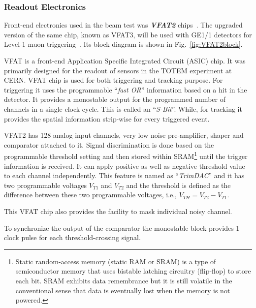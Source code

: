 \subsubsection{Readout Electronics} %
\label{ssub:readout_electronics}
Front-end electronics used in the beam test was \textbf{\textit{VFAT2}} chips~\cite{Aspell2007,Berardi2004}.
The upgraded version of the same chip, known as VFAT3, will be used with GE1/1 detectors for Level-1 muon triggering~\cite{Licciulli2017}. Its block diagram is shown in Fig.~\ref{fig:VFAT2block}.

VFAT is a front-end Application Specific Integrated Circuit (ASIC) chip. It was primarily designed for the readout of sensors in the TOTEM experiment at CERN. 
VFAT chip is used for both triggering and tracking purpose.
For triggering it uses the programmable ``\textit{fast OR}'' information based on a hit in the detector.
It provides a monostable output for the programmed number of channels in a single clock cycle. 
This is called an ``\textit{S-Bit}''. While, for tracking it provides the spatial information strip-wise for every triggered event.

VFAT2 has 128 analog input channels, very low noise pre-amplifier, shaper and comparator attached to it. 
Signal discrimination is done based on the programmable threshold setting and then stored within SRAM\footnote{Static random-access memory (static RAM or SRAM) is a type of semiconductor memory that uses bistable latching circuitry (flip-flop) to store each bit. SRAM exhibits data remembrance but it is still volatile in the conventional sense that data is eventually lost when the memory is not powered.} until the trigger information is received. 
It can apply positive as well as negative threshold value to each channel independently. 
This feature is named as ``\textit{TrimDAC}'' and it has two programmable voltages $V_{T1}$ and $V_{T2}$ and the threshold is defined as the difference between these two programmable voltages, i.e., $V_{TH} = V_{T2} - V_{T1}$.

This VFAT chip also provides the facility to mask individual noisy channel.

To synchronize the output of the comparator the monostable block provides 1 clock pulse for each threshold-crossing signal.

